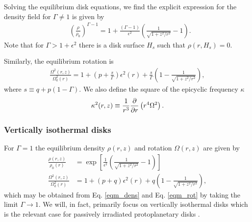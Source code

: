 Solving the equilibrium disk equations, we find the explicit
expression for the density field for 
$\Gamma\neq1$ is given  by
\begin{align}\label{eqm_dens}
  &\left(\frac{\rho}{\rho_0}\right)^{\Gamma-1} = 1 +
  \frac{\left(\Gamma-1\right)}{\epsilon^2}\left(\frac{1}{\sqrt{1+z^2/r^2}}-1\right).
\end{align}
Note that for $\Gamma > 1 + \epsilon^2$ there is a disk surface $H_s$
such that $\rho(r,H_s)=0$. 

Similarly, the equilibrium rotation is 
\begin{align}\label{eqm_rot}
  \frac{\Omega^2(r,z)}{\Omega_k^2(r)}=1 +
  \left(p+\frac{s}{\Gamma}\right)\epsilon^2(r) 
  +\frac{s}{\Gamma} \left(1-\frac{1}{\sqrt{1+z^2/r^2}}\right), 
\end{align}
where $s\equiv q+p(1-\Gamma)$. We also define %
the square of the epicyclic frequency $\kappa$ 
\begin{align}
  \kappa^2(r,z) \equiv \frac{1}{r^3}\frac{\p }{\p
    r}\left(r^4\Omega^2\right). %
\end{align}


\subsubsection{Vertically isothermal disks}
For $\Gamma=1$ the equilibrium density $\rho(r,z)$ and rotation
$\Omega(r,z)$ are given by 
\begin{align}
  \frac{\rho(r,z)}{\rho_0(r)} &=
  \exp{\left[\frac{1}{\epsilon^2}\left(\frac{1}{\sqrt{1+z^2/r^2}}-1\right)\right]}\\    
  \frac{\Omega^2(r,z)}{\Omega_k^2(r)}& =1+ (p+q)\epsilon^2(r) + q\left(1 -
    \frac{1}{\sqrt{1+z^2/r^2}}\right),\label{vertiso_eqm}
\end{align}
which may be obtained from Eq. \ref{eqm_dens} and Eq. \ref{eqm_rot} by
taking the limit $\Gamma\to 1$. We will, in fact, primarily focus on
vertically isothermal disks which is the relevant case for passively irradiated
protoplanetary disks \citep{chiang97}. 


